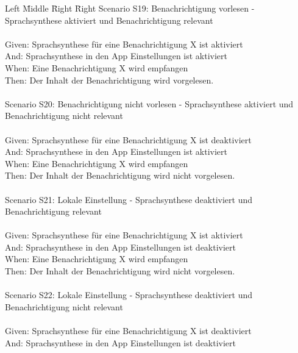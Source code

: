 \begin{tabbing}
    Left \= Middle \= Right \= Right \kill
    Scenario S19: \> \> \> Benachrichtigung vorlesen - Sprachsynthese aktiviert und Benachrichtigung relevant \\ \\
    Given:  \> \> \> Sprachsynthese für eine Benachrichtigung X ist aktiviert \\
    And:  \> \> \> Sprachsynthese in den App Einstellungen ist aktiviert \\
    When:   \> \> \> Eine Benachrichtigung X wird empfangen \\
    Then:   \> \> \> Der Inhalt der Benachrichtigung wird vorgelesen. \\
    \\
    Scenario S20: \> \> \> Benachrichtigung nicht vorlesen - Sprachsynthese aktiviert und Benachrichtigung nicht relevant \\ \\
    Given:  \> \> \> Sprachsynthese für eine Benachrichtigung X ist deaktiviert \\
    And:  \> \> \> Sprachsynthese in den App Einstellungen ist aktiviert \\
    When:   \> \> \> Eine Benachrichtigung X wird empfangen \\
    Then:   \> \> \> Der Inhalt der Benachrichtigung wird nicht vorgelesen. \\
    \\
    Scenario S21: \> \> \> Lokale Einstellung - Sprachsynthese deaktiviert und Benachrichtigung relevant \\ \\
    Given:  \> \> \> Sprachsynthese für eine Benachrichtigung X ist aktiviert \\
    And:  \> \> \> Sprachsynthese in den App Einstellungen ist deaktiviert \\
    When:   \> \> \> Eine Benachrichtigung X wird empfangen \\
    Then:   \> \> \> Der Inhalt der Benachrichtigung wird nicht vorgelesen. \\
    \\
    Scenario S22: \> \> \> Lokale Einstellung - Sprachsynthese deaktiviert und Benachrichtigung nicht relevant \\ \\
    Given:  \> \> \> Sprachsynthese für eine Benachrichtigung X ist deaktiviert \\
    And:  \> \> \> Sprachsynthese in den App Einstellungen ist deaktiviert \\

\end{tabbing}
